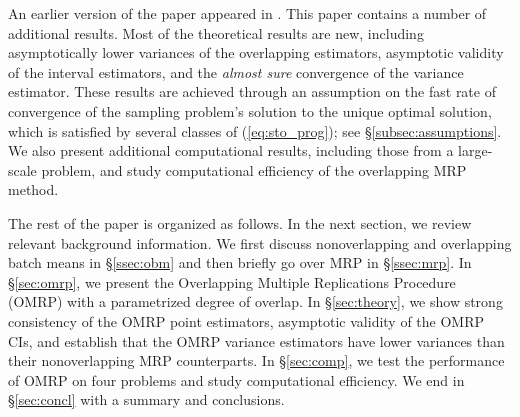 \documentclass[12pt]{article}
\begin{document}
An earlier version of the paper appeared in \citep{love2011overlapping}. 
This paper contains a number of additional results. 
Most of the theoretical results are new, including asymptotically lower variances of the overlapping estimators, asymptotic validity of the interval estimators, and the {\it almost sure} convergence of the variance estimator. 
These results are achieved through an assumption on the fast rate of convergence of the sampling problem's solution to the unique optimal solution, which is satisfied by several classes of (\ref{eq:sto_prog}); see \S \ref{subsec:assumptions}.
We also present additional computational results, including those from a large-scale problem, and study computational efficiency of the overlapping MRP method. 



The rest of the paper is organized as follows.  
In the next section, we review relevant background information.  
We first discuss nonoverlapping and overlapping batch means in \S \ref{ssec:obm} and then briefly go over MRP in \S \ref{ssec:mrp}.  
In \S \ref{sec:omrp}, we present the Overlapping Multiple Replications Procedure (OMRP) with a parametrized degree of overlap.  
In \S \ref{sec:theory}, we show strong consistency of the OMRP point estimators, asymptotic validity of the OMRP CIs, and establish that the OMRP variance estimators have lower variances than their nonoverlapping MRP counterparts.
In \S \ref{sec:comp}, we test the performance of OMRP on four problems and study computational efficiency. 
We end in \S \ref{sec:concl} with a summary and conclusions.





\end{document}
